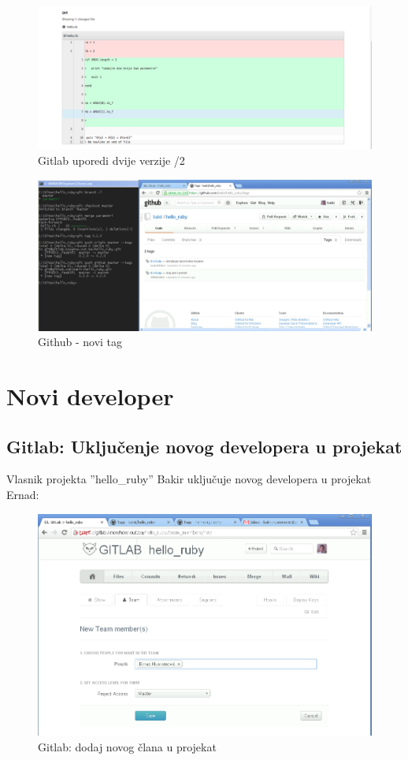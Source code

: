 \documentclass[times, utf8, seminar]{fit}
\begin{document}
\begin{figure}[H]
\centering
\includegraphics[width=15cm]{img/gitlab_compare_2.png}
\caption{Gitlab uporedi dvije verzije /2}
\end{figure}


\begin{figure}[H]
\centering
\includegraphics[width=16cm]{img/github_new_tag.png}
\caption{Github - novi tag}
\end{figure}


\section{Novi developer}

\subsection{Gitlab: Uključenje novog developera u projekat}

Vlasnik projekta ''hello\_ruby'' Bakir uključuje novog developera u projekat Ernad:

\begin{figure}[H]
\centering
\includegraphics[width=15cm]{img/gitlab_add_new_member_to_project.png}
\caption{Gitlab: dodaj novog člana u projekat}
\end{figure}
\end{document}
